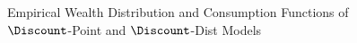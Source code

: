 \begin{figure}
\caption{Empirical Wealth Distribution and Consumption Functions of $\Discount$-Point and $\Discount$-Dist Models}
\label{CFuncDistSevenPointAndHistNetWorthPlotQuarterly}
\end{figure}
